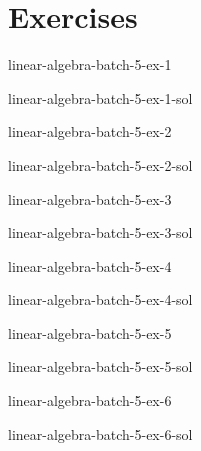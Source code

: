 \documentclass[preview]{standalone}
\begin{document}
\genpage

\section{Exercises}

\begin{snippetexercise}{linear-algebra-batch-5-ex-1}{}
    \todo
\end{snippetexercise}

\begin{snippetsolution}{linear-algebra-batch-5-ex-1-sol}{}
    \todo
\end{snippetsolution}

\begin{snippetexercise}{linear-algebra-batch-5-ex-2}{}
    \todo
\end{snippetexercise}

\begin{snippetsolution}{linear-algebra-batch-5-ex-2-sol}{}
    \todo
\end{snippetsolution}

\begin{snippetexercise}{linear-algebra-batch-5-ex-3}{}
    \todo
\end{snippetexercise}

\begin{snippetsolution}{linear-algebra-batch-5-ex-3-sol}{}
    \todo
\end{snippetsolution}

\begin{snippetexercise}{linear-algebra-batch-5-ex-4}{}
    \todo
\end{snippetexercise}

\begin{snippetsolution}{linear-algebra-batch-5-ex-4-sol}{}
    \todo
\end{snippetsolution}

\begin{snippetexercise}{linear-algebra-batch-5-ex-5}{}
    \todo
\end{snippetexercise}

\begin{snippetsolution}{linear-algebra-batch-5-ex-5-sol}{}
    \todo
\end{snippetsolution}

\begin{snippetexercise}{linear-algebra-batch-5-ex-6}{}
    \todo
\end{snippetexercise}

\begin{snippetsolution}{linear-algebra-batch-5-ex-6-sol}{}
    \todo
\end{snippetsolution}
\end{document}
